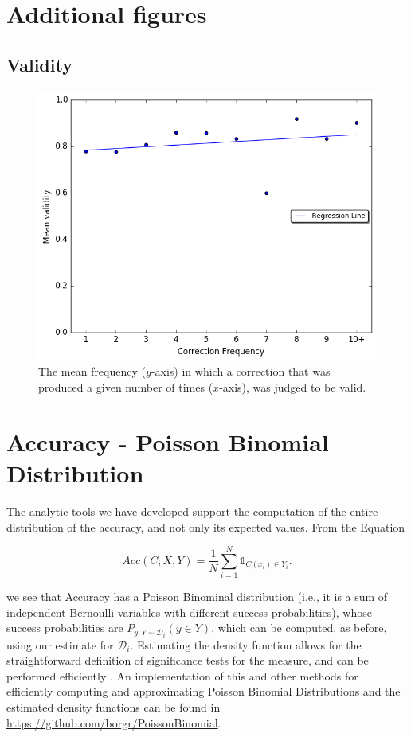 \documentclass[letterpaper, 11pt]{article}
\newenvironment{myequation}{
  \vspace{-1em}
 \begin{equation}
}{
 \end{equation}
 \vspace{-1.2em}
}
\begin{document}
\section{Additional figures}
\subsection{Validity}\label{ap:validity_judgements}
\begin{figure}[h!]
	\vspace{-.3cm}
	\includegraphics[width=0.9\columnwidth]{IAA_confirmation_frequency}
	\caption{The mean frequency ($y$-axis) in which a correction that was produced
		a given number of times ($x$-axis), was judged to be valid.
		\label{fig:validity_judgements}}
	\vspace{-0.3cm}
\end{figure}
\FloatBarrier

\section{Accuracy - Poisson Binomial Distribution}\label{ap:poibin}
The analytic tools we have developed support the computation of the entire distribution of the accuracy, and not only its expected values. From the Equation 
	
	\begin{myequation}
		Acc\left(C;X,Y\right) = \frac{1}{N} \sum_{i=1}^N \mathds{1}_{C(x_i) \in Y_i}.
	\end{myequation}
	
\noindent
 we see that Accuracy has a Poisson Binominal distribution (i.e., it is a sum of independent Bernoulli variables with different success probabilities), whose success probabilities are $P_{y,Y \sim \mathcal{D}_i}(y \in Y)$, which can be computed, as before, using our estimate for $\mathcal{D}_i$. Estimating the density function allows for the straightforward definition of significance tests for the measure, and can be performed efficiently \cite{hong2013computing}. An implementation of this and other methods for efficiently computing and approximating Poisson Binomial Distributions and the estimated density functions can be found in \url{https://github.com/borgr/PoissonBinomial}.
\end{document}

